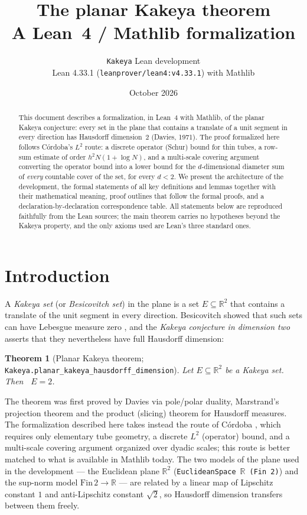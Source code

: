 \documentclass[11pt,a4paper]{article}
\title{The planar Kakeya theorem\\[2pt] \large A Lean~4 / Mathlib formalization}
\author{\texttt{Kakeya} Lean development\\[2pt]
  \small Lean 4.33.1 (\texttt{leanprover/lean4:v4.33.1}) with Mathlib}
\date{October 2026}
\newcommand{\R}{\mathbb{R}}
\DeclareMathOperator{\Hdim}{dim_H}
\newcommand{\Plane}{\ensuremath{\mathbb{R}^{2}}}     %
\newcommand{\FinTwo}{\ensuremath{\mathrm{Fin}\,2 \to \R}}
\newcommand{\lname}[1]{\texttt{#1}}                  %
\newtheorem{theorem}{Theorem}[section]
\theoremstyle{definition}
\theoremstyle{remark}
\begin{document}
\maketitle

\begin{abstract}
\noindent
This document describes a formalization, in Lean~4 with Mathlib, of the planar Kakeya
conjecture: every set in the plane that contains a translate of a unit segment in every
direction has Hausdorff dimension~$2$ (Davies, 1971).  The proof formalized here follows
C\'ordoba's $L^2$ route: a discrete operator (Schur) bound for thin tubes, a row-sum estimate
of order $h^{2}N(1+\log N)$, and a multi-scale covering argument converting the operator
bound into a lower bound for the $d$-dimensional diameter sum of \emph{every} countable
cover of the set, for every $d<2$.  We present the architecture of the development, the
formal statements of all key definitions and lemmas together with their mathematical
meaning, proof outlines that follow the formal proofs, and a declaration-by-declaration
correspondence table.  All statements below are reproduced faithfully from the Lean
sources; the main theorem carries no hypotheses beyond the Kakeya property, and the only
axioms used are Lean's three standard ones.
\end{abstract}

\tableofcontents

\section{Introduction}

A \emph{Kakeya set} (or \emph{Besicovitch set}) in the plane is a set $E\subseteq\Plane$
that contains a translate of the unit segment in every direction.  Besicovitch showed that
such sets can have Lebesgue measure zero \cite{Besicovitch1928}, and the \emph{Kakeya
conjecture in dimension two} asserts that they nevertheless have full Hausdorff dimension:

\begin{theorem}[Planar Kakeya theorem; {\lname{Kakeya.planar\_kakeya\_hausdorff\_dimension}}]
\label{thm:main}
Let $E\subseteq\Plane$ be a Kakeya set.  Then $\Hdim E = 2$.
\end{theorem}

The theorem was first proved by Davies \cite{Davies1971} via pole/polar duality, Marstrand's
projection theorem and the product (slicing) theorem for Hausdorff measures.  The
formalization described here takes instead the route of C\'ordoba \cite{Cordoba1977}, which
requires only elementary tube geometry, a discrete $L^2$ (operator) bound, and a
multi-scale covering argument organized over dyadic scales; this route is better matched to
what is available in Mathlib today.  The two models of the plane used in the development ---
the Euclidean plane $\Plane$ (\lname{EuclideanSpace}~$\R$~\lname{(Fin 2)}) and the sup-norm model
$\FinTwo$ --- are related by a linear map of Lipschitz constant $1$ and anti-Lipschitz
constant $\sqrt{2}$, so Hausdorff dimension transfers between them freely.
\end{document}
